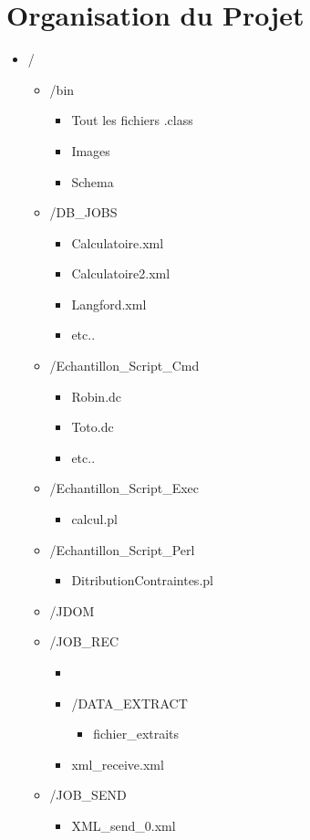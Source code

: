 \documentclass[11pt]{report}
\begin{document}
\section{Organisation du Projet}
\begin{itemize}
\item / \begin{itemize}
		\item /bin  \begin{itemize} \item Tout les fichiers .class \item Images \item Schema    \end{itemize}
		\item /DB\_JOBS \begin{itemize} \item Calculatoire.xml \item Calculatoire2.xml \item Langford.xml \item etc.. \end{itemize}
		\item /Echantillon\_Script\_Cmd \begin{itemize} \item Robin.dc \item Toto.dc \item etc..\end{itemize}
		\item /Echantillon\_Script\_Exec \begin{itemize}\item calcul.pl  \end{itemize}
		\item /Echantillon\_Script\_Perl \begin{itemize}\item  DitributionContraintes.pl \end{itemize}
		\item /JDOM  
		\item /JOB\_REC \begin{itemize} \item \item /DATA\_EXTRACT \begin{itemize} \item fichier\_extraits\end{itemize}\item xml\_receive.xml  \end{itemize}
		\item /JOB\_SEND \begin{itemize}\item XML\_send\_0.xml \end{itemize}

\end{itemize}
\end{itemize}
\end{document}
